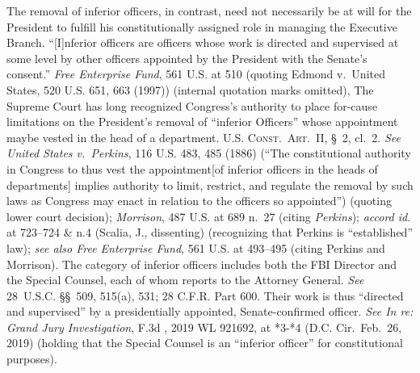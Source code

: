 The removal of inferior officers, in contrast, need not necessarily be at will for the President to fulfill his constitutionally assigned role in managing the Executive Branch.
``[I]nferior officers are officers whose work is directed and supervised at some level by other officers appointed by the President with the Senate's consent.''
\textit{Free Enterprise Fund}, 561 U.S. at 510 (quoting Edmond v.\ United States, 520 U.S. 651, 663 (1997)) (internal quotation marks omitted), The Supreme Court has long recognized Congress's authority to place for-cause limitations on the President's removal of ``inferior Officers'' whose appointment maybe vested in the head of a department.
\textsc{U.S. Const.\ Art.~II}, \S~2, cl.~2.
\textit{See United States v.\ Perkins}, 116 U.S. 483, 485 (1886) (``The constitutional authority in Congress to thus vest the appointment[of inferior officers in the heads of departments] implies authority to limit, restrict, and regulate the removal by such laws as Congress may enact in relation to the officers so appointed'') (quoting lower court decision);
\textit{Morrison}, 487 U.S. at 689 n.~27 (citing \textit{Perkins});
\textit{accord id}. at 723--724 \& n.4 (Scalia, J., dissenting) (recognizing that Perkins is ``established'' law);
\textit{see also Free Enterprise Fund}, 561 U.S. at 493--495 (citing Perkins and Morrison).
The category of inferior officers includes both the FBI Director and the Special Counsel, each of whom reports to the Attorney General.
\textit{See} 28~U.S.C. \S\S~509, 515(a), 531; 28 C.F.R. Part 600.
Their work is thus ``directed and supervised'' by a presidentially appointed, Senate-confirmed officer.
\textit{See In re: Grand Jury Investigation}, \textunderscore\textunderscore F.3d \textunderscore\textunderscore, 2019 WL 921692, at *3-*4 (D.C. Cir.\ Feb.~26, 2019) (holding that the Special Counsel is an ``inferior officer'' for constitutional purposes).

